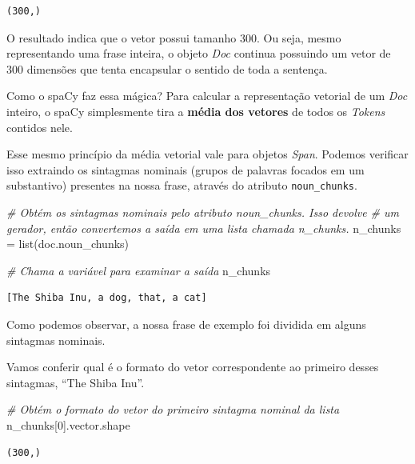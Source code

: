\documentclass[
  brazilian,
]{article}
\newenvironment{Shaded}{}{}
\newcommand{\BuiltInTok}[1]{#1}
\newcommand{\CommentTok}[1]{\textcolor[rgb]{0.38,0.63,0.69}{\textit{#1}}}
\newcommand{\DecValTok}[1]{\textcolor[rgb]{0.25,0.63,0.44}{#1}}
\newcommand{\NormalTok}[1]{#1}
\newcommand{\OperatorTok}[1]{\textcolor[rgb]{0.40,0.40,0.40}{#1}}
\begin{document}
\begin{verbatim}
(300,)
\end{verbatim}

O resultado indica que o vetor possui tamanho 300. Ou seja, mesmo
representando uma frase inteira, o objeto \emph{Doc} continua possuindo
um vetor de 300 dimensões que tenta encapsular o sentido de toda a
sentença.

Como o spaCy faz essa mágica? Para calcular a representação vetorial de
um \emph{Doc} inteiro, o spaCy simplesmente tira a \textbf{média dos
vetores} de todos os \emph{Tokens} contidos nele.

Esse mesmo princípio da média vetorial vale para objetos \emph{Span}.
Podemos verificar isso extraindo os sintagmas nominais (grupos de
palavras focados em um substantivo) presentes na nossa frase, através do
atributo \texttt{noun\_chunks}.

\begin{Shaded}
\begin{Highlighting}[]
\CommentTok{\# Obtém os sintagmas nominais pelo atributo \textquotesingle{}noun\_chunks\textquotesingle{}. Isso devolve}
\CommentTok{\# um gerador, então convertemos a saída em uma lista chamada \textquotesingle{}n\_chunks\textquotesingle{}.}
\NormalTok{n\_chunks }\OperatorTok{=} \BuiltInTok{list}\NormalTok{(doc.noun\_chunks)}

\CommentTok{\# Chama a variável para examinar a saída}
\NormalTok{n\_chunks}
\end{Highlighting}
\end{Shaded}

\begin{verbatim}
[The Shiba Inu, a dog, that, a cat]
\end{verbatim}

Como podemos observar, a nossa frase de exemplo foi dividida em alguns
sintagmas nominais.

Vamos conferir qual é o formato do vetor correspondente ao primeiro
desses sintagmas, ``The Shiba Inu''.

\begin{Shaded}
\begin{Highlighting}[]
\CommentTok{\# Obtém o formato do vetor do primeiro sintagma nominal da lista}
\NormalTok{n\_chunks[}\DecValTok{0}\NormalTok{].vector.shape}
\end{Highlighting}
\end{Shaded}

\begin{verbatim}
(300,)
\end{verbatim}
\end{document}
